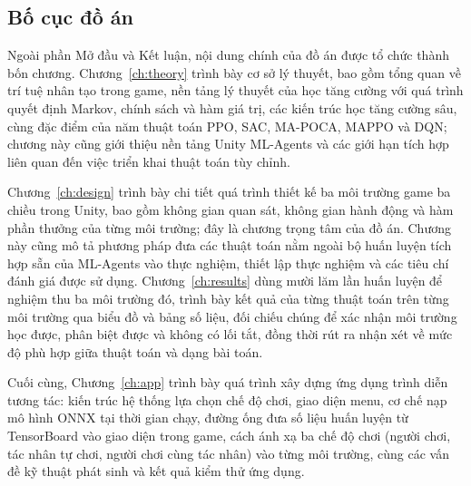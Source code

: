 \subsection{Bố cục đồ án}
\indent Ngoài phần Mở đầu và Kết luận, nội dung chính của đồ án được tổ chức thành bốn
chương. Chương~\ref{ch:theory} trình bày cơ sở lý thuyết, bao gồm tổng quan về trí tuệ
nhân tạo trong game, nền tảng lý thuyết của học tăng cường với quá trình quyết định
Markov, chính sách và hàm giá trị, các kiến trúc học tăng cường sâu, cùng đặc điểm của
năm thuật toán PPO, SAC, MA-POCA, MAPPO và DQN; chương này cũng giới thiệu nền tảng Unity
ML-Agents và các giới hạn tích hợp liên quan đến việc triển khai thuật toán tùy chỉnh.

\indent Chương~\ref{ch:design} trình bày chi tiết quá trình thiết kế ba môi trường
game ba chiều trong Unity, bao gồm không gian quan sát, không gian hành động và hàm
phần thưởng của từng môi trường; đây là chương trọng tâm của đồ án. Chương này cũng mô
tả phương pháp đưa các thuật toán nằm ngoài bộ huấn luyện tích hợp sẵn của ML-Agents
vào thực nghiệm, thiết lập thực nghiệm và các tiêu chí đánh giá được sử dụng.
Chương~\ref{ch:results} dùng mười lăm lần huấn luyện để nghiệm thu ba môi trường đó,
trình bày kết quả của từng thuật toán trên từng môi trường qua biểu đồ và bảng số liệu,
đối chiếu chúng để xác nhận môi trường học được, phân biệt được và không có lối tắt,
đồng thời rút ra nhận xét về mức độ phù hợp giữa thuật toán và dạng bài toán.

\indent Cuối cùng, Chương~\ref{ch:app} trình bày quá trình xây dựng ứng dụng trình
diễn tương tác: kiến trúc hệ thống lựa chọn chế độ chơi, giao diện menu, cơ chế nạp
mô hình ONNX tại thời gian chạy, đường ống đưa số liệu huấn luyện từ TensorBoard vào
giao diện trong game, cách ánh xạ ba chế độ chơi (người chơi, tác nhân tự chơi, người
chơi cùng tác nhân) vào từng môi trường, cùng các
vấn đề kỹ thuật phát sinh và kết quả kiểm thử ứng dụng.

